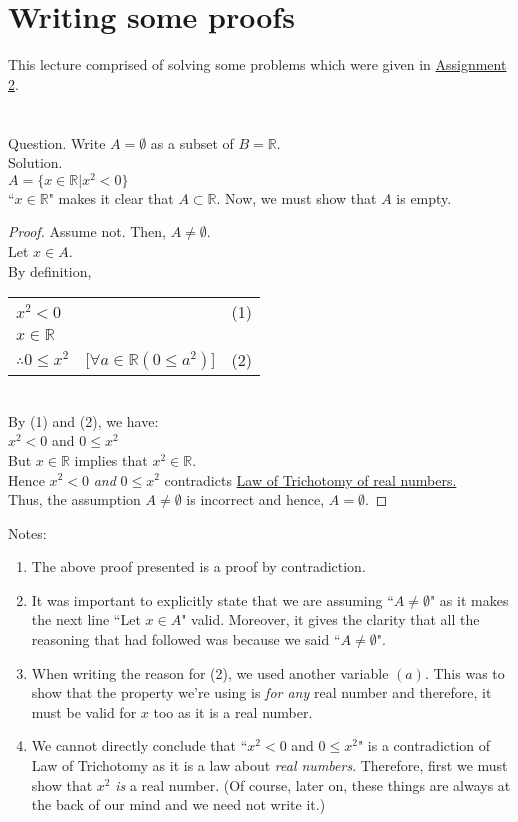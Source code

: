 \section{Writing some proofs}\label{sec:writingproofs}
This lecture comprised of solving some problems which were given in \hyperref[assign:2]{Assignment 2}.\\

\hrulefill
\ \\~\\
Question. Write $A = \emptyset$ as a subset of $B = \mathbb{R}$.\\
Solution.\\
    $A = \{x\in\mathbb{R}|x^2 < 0\}$\\
    ``$x\in\mathbb{R}$" makes it clear that $A \subset \mathbb{R}$. Now, we must show that $A$ is empty.
    \begin{proof}
    Assume not. Then, $A \neq \emptyset$.\\
    Let $x \in A$.\\
    By definition, 
    \begin{tabular}[t]{l r r}
        $x^2 < 0$ & & (1)  \\
        $x \in \mathbb{R}$ & & \\
        $\therefore 0 \le x^2$ & [$\forall a \in \mathbb{R}(0 \le a^2)$] &(2)
    \end{tabular}\\
    By (1) and (2), we have:\\
    $x^2 < 0$ and $0 \le x^2$\\
    But $x \in \mathbb{R}$ implies that $x^2 \in \mathbb{R}$.\\
    Hence $x^2 < 0$ \textit{and} $0 \le x^2$ contradicts \hyperref[sec:LoT]{Law of Trichotomy of real numbers.}\\
    Thus, the assumption $A \neq \emptyset$ is incorrect and hence, $A = \emptyset$.
    \end{proof}

\dotfill
    
    Notes:
    \begin{enumerate}
        \item The above proof presented is a proof by contradiction.
        \item It was important to explicitly state that we are assuming ``$A \neq \emptyset$" as it makes the next line ``Let $x \in A$" valid. Moreover, it gives the clarity that all the reasoning that had followed was because we said ``$A \neq \emptyset$".
        \item When writing the reason for (2), we used another variable $(a)$. This was to show that the property we're using is \textit{for any} real number and therefore, it must be valid for $x$ too as it is a real number.
        \item We cannot directly conclude that ``$x^2 < 0$ and $0 \le x^2$" is a contradiction of Law of Trichotomy as it is a law about \textit{real numbers}. Therefore, first we must show that $x^2$ \textit{is} a real number. (Of course, later on, these things are always at the back of our mind and we need not write it.)
    \end{enumerate}

